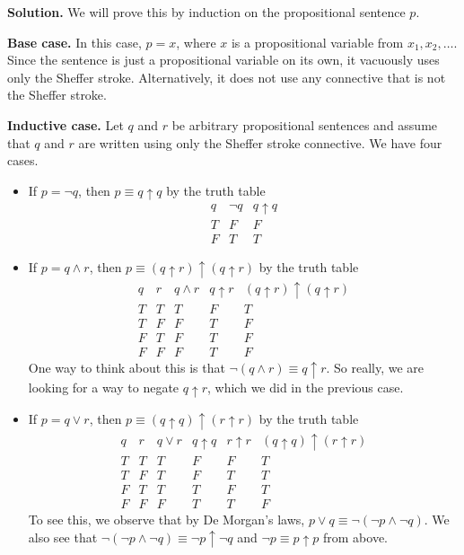 \documentclass[11pt]{article}
\begin{document}
\begin{enumerate}[leftmargin=*]
\textbf{Solution.} We will prove this by induction on the propositional sentence $p$.

\textbf{Base case.} In this case, $p=x$, where $x$ is a propositional variable from $x_1,x_2,\ldots$.
Since the sentence is just a propositional variable on its own, it vacuously uses only the Sheffer stroke.
Alternatively, it does not use any connective that is not the Sheffer stroke.

\textbf{Inductive case.} Let $q$ and $r$ be arbitrary propositional sentences and assume that $q$ and $r$ are written using only the Sheffer stroke connective. We have four cases.

\begin{itemize}
  \item If $p=\neg q$, then $p\equiv q\uparrow q$ by the truth table
  \[
  \begin{array}{c|c|c}
  q & \neg q & q\uparrow q \\
  \hline
  T & F & F \\
  F & T & T
  \end{array}
  \]

  \item If $p=q\land r$, then $p\equiv (q\uparrow r)\uparrow(q\uparrow r)$ by the truth table
  \[
  \begin{array}{c|c|c|c|c}
  q & r & q\land r & q\uparrow r & (q\uparrow r)\uparrow(q\uparrow r) \\
  \hline
  T & T & T & F & T \\
  T & F & F & T & F \\
  F & T & F & T & F \\
  F & F & F & T & F
  \end{array}
  \]
  One way to think about this is that $\neg(q\land r)\equiv q\uparrow r$. So really, we are looking for a way to negate $q\uparrow r$, which we did in the previous case.

  \item If $p=q\lor r$, then $p\equiv (q\uparrow q)\uparrow(r\uparrow r)$ by the truth table
  \[
  \begin{array}{c|c|c|c|c|c}
  q & r & q\lor r & q\uparrow q & r\uparrow r & (q\uparrow q)\uparrow(r\uparrow r) \\
  \hline
  T & T & T & F & F & T \\
  T & F & T & F & T & T \\
  F & T & T & T & F & T \\
  F & F & F & T & T & F
  \end{array}
  \]
  To see this, we observe that by De Morgan's laws, $p\lor q\equiv \neg(\neg p\land\neg q)$.
  We also see that $\neg(\neg p\land\neg q)\equiv \neg p\uparrow\neg q$ and $\neg p\equiv p\uparrow p$ from above.


\end{itemize}
\end{enumerate}
\end{document}
